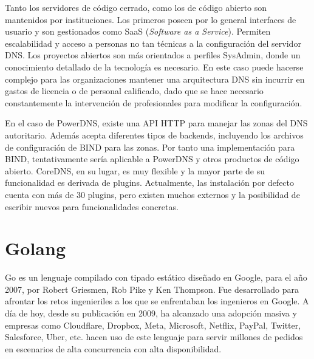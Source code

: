 Tanto los servidores de código cerrado, como los de código abierto son mantenidos por instituciones. Los primeros poseen por lo general interfaces de usuario y son gestionados como SaaS (\textit{Software as a Service}). Permiten escalabilidad y acceso a personas no tan técnicas a la configuración del servidor DNS. Los proyectos abiertos son más orientados a perfiles SysAdmin, donde un conocimiento detallado de la tecnología es necesario. En este caso puede hacerse complejo para las organizaciones mantener una arquitectura DNS sin incurrir en gastos de licencia o de personal calificado, dado que se hace necesario constantemente la intervención de profesionales para modificar la configuración.

En el caso de PowerDNS, existe una API HTTP para manejar las zonas del DNS autoritario. Además acepta diferentes tipos de backends, incluyendo los archivos de configuración de BIND para las zonas. Por tanto una implementación para BIND, tentativamente sería aplicable a PowerDNS y otros productos de código abierto. CoreDNS, en su lugar, es muy flexible y la mayor parte de su funcionalidad es derivada de plugins. Actualmente, las instalación por defecto cuenta con más de 30 plugins, pero existen muchos externos y la posibilidad de escribir nuevos para funcionalidades concretas.



\section{Golang}

Go es un lenguaje compilado con tipado estático diseñado en Google, para el año 2007, por Robert Griesmen, Rob Pike y Ken Thompson. Fue desarrollado para afrontar los retos ingenieriles a los que se enfrentaban los ingenieros en Google. A día de hoy, desde su publicación en 2009, ha alcanzado una adopción masiva y empresas como Cloudflare, Dropbox, Meta, Microsoft, Netflix, PayPal, Twitter, Salesforce, Uber, etc. hacen uso de este lenguaje para servir millones de pedidos en escenarios de alta concurrencia con alta disponibilidad.                                                            

